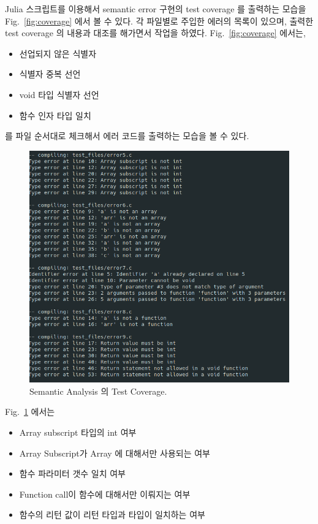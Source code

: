 \documentclass[a4paper, 12p]{paper}
\begin{document}
Julia 스크립트를 이용해서 semantic error 구현의 test coverage 를 출력하는 모습을 Fig.~\ref{fig:coverage} 에서 볼 수 있다. 각 파일별로 주입한 에러의 목록이 있으며, 출력한 test coverage 의 내용과 대조를 해가면서 작업을 하였다. Fig.~\ref{fig:coverage} 에서는,

\begin{itemize}
\item 선업되지 않은 식별자
\item 식별자 중복 선언
\item void 타입 식별자 선언
\item 함수 인자 타입 일치
\end{itemize}

를 파일 순서대로 체크해서 에러 코드를 출력하는 모습을 볼 수 있다.

\begin{figure}[H]
  \centering
\includegraphics[scale=0.5]{figs/coverage2.png}
\caption{Semantic Analysis 의 Test Coverage.}\label{fig:coverage2}
\end{figure}

Fig.~\ref{fig:coverage2} 에서는

\begin{itemize}
\item Array subscript 타입의 int 여부
\item Array Subscript가 Array 에 대해서만 사용되는 여부
\item 함수 파라미터 갯수 일치 여부
\item Function call이 함수에 대해서만 이뤄지는 여부
\item 함수의 리턴 값이 리턴 타입과 타입이 일치하는 여부
\end{itemize}
\end{document}
